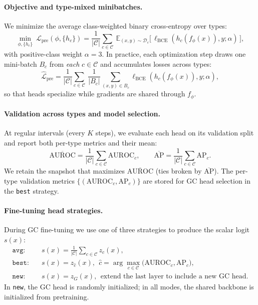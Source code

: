 \documentclass[journal,article,submit,pdftex,moreauthors]{Definitions/mdpi}
\begin{document}
\paragraph{Objective and type-mixed minibatches.}
We minimize the average class-weighted binary cross-entropy over types:
\begin{equation}
\label{eq:pre_obj}
\min_{\phi,\{h_c\}}\ \mathcal{L}_{\mathrm{pre}}(\phi,\{h_c\})=\frac{1}{|\mathcal{C}|}\sum_{c\in\mathcal{C}} \ \mathbb{E}_{(x,y)\sim\mathcal{D}_c}\!\big[\,\ell_{\mathrm{BCE}}(h_c(f_\phi(x)),y;\alpha)\,\big],
\end{equation}
with positive-class weight $\alpha{=}3$. In practice, each optimization step draws one mini-batch $B_c$ from \emph{each} $c\in\mathcal{C}$ and accumulates losses across types:
\begin{equation}
\label{eq:pre_mix}
\hat{\mathcal{L}}_{\mathrm{pre}}=\frac{1}{|\mathcal{C}|}\sum_{c\in\mathcal{C}}\ \frac{1}{|B_c|}\sum_{(x,y)\in B_c}\ell_{\mathrm{BCE}}(h_c(f_\phi(x)),y;\alpha),
\end{equation}
so that heads specialize while gradients are shared through $f_\phi$.

\paragraph{Validation across types and model selection.}
At regular intervals (every $K$ steps), we evaluate each head on its validation split and report both per-type metrics and their mean:
\begin{equation}
\overline{\mathrm{AUROC}}=\frac{1}{|\mathcal{C}|}\sum_{c\in\mathcal{C}}\mathrm{AUROC}_c,\qquad
\overline{\mathrm{AP}}=\frac{1}{|\mathcal{C}|}\sum_{c\in\mathcal{C}}\mathrm{AP}_c.
\end{equation}
We retain the snapshot that maximizes $\overline{\mathrm{AUROC}}$ (ties broken by $\overline{\mathrm{AP}}$). The per-type validation metrics $\{(\mathrm{AUROC}_c,\mathrm{AP}_c)\}$ are stored for GC head selection in the \texttt{best} strategy.

\paragraph{Fine-tuning head strategies.}
During GC fine-tuning we use one of three strategies to produce the scalar logit $s(x)$:
\begin{align}
\texttt{avg:}\quad & s(x)=\frac{1}{|\mathcal{C}|}\sum_{c\in\mathcal{C}} z_c(x),\\
\texttt{best:}\quad & s(x)=z_{\hat c}(x),\ \ \hat c=\arg\max_{c\in\mathcal{C}}\big(\mathrm{AUROC}_c,\mathrm{AP}_c\big),\\
\texttt{new:}\quad & s(x)=z_G(x),\ \ \text{extend the last layer to include a new GC head.}
\end{align}
In \texttt{new}, the GC head is randomly initialized; in all modes, the shared backbone is initialized from pretraining.
\end{document}
